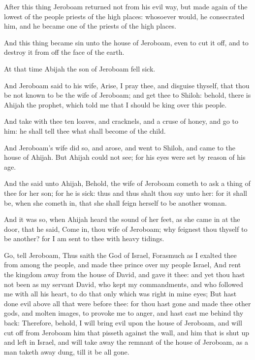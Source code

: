 \Verse After this thing Jeroboam returned not from his evil way, but made again of the lowest of the people priests of the high places: whosoever would, he consecrated him, and he became one of the priests of the high places.

\Verse And this thing became sin unto the house of Jeroboam, even to cut it off, and to destroy it from off the face of the earth.


\Chapter
\Verse At that time Abijah the son of Jeroboam fell sick.

\Verse And Jeroboam said to his wife, Arise, I pray thee, and disguise thyself, that thou be not known to be the wife of Jeroboam; and get thee to Shiloh: behold, there is Ahijah the prophet, which told me that I should be king over this people.

\Verse And take with thee ten loaves, and cracknels, and a cruse of honey, and go to him: he shall tell thee what shall become of the child.

\Verse And Jeroboam's wife did so, and arose, and went to Shiloh, and came to the house of Ahijah. But Ahijah could not see; for his eyes were set by reason of his age.

\Verse And the \LORD said unto Ahijah, Behold, the wife of Jeroboam cometh to ask a thing of thee for her son; for he is sick: thus and thus shalt thou say unto her: for it shall be, when she cometh in, that she shall feign herself to be another woman.

\Verse And it was so, when Ahijah heard the sound of her feet, as she came in at the door, that he said, Come in, thou wife of Jeroboam; why feignest thou thyself to be another? for I am sent to thee with heavy tidings.

\Verse Go, tell Jeroboam, Thus saith the \LORD God of Israel, Forasmuch as I exalted thee from among the people, and made thee prince over my people Israel, \Verse And rent the kingdom away from the house of David, and gave it thee: and yet thou hast not been as my servant David, who kept my commandments, and who followed me with all his heart, to do that only which was right in mine eyes; \Verse But hast done evil above all that were before thee: for thou hast gone and made thee other gods, and molten images, to provoke me to anger, and hast cast me behind thy back: \Verse Therefore, behold, I will bring evil upon the house of Jeroboam, and will cut off from Jeroboam him that pisseth against the wall, and him that is shut up and left in Israel, and will take away the remnant of the house of Jeroboam, as a man taketh away dung, till it be all gone.

